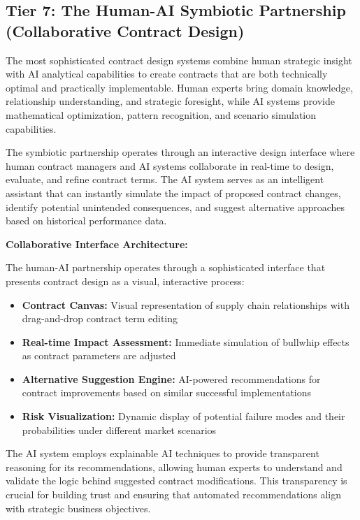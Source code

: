 \documentclass{article}
\begin{document}
\subsection{Tier 7: The Human-AI Symbiotic Partnership (Collaborative Contract Design)}

The most sophisticated contract design systems combine human strategic insight with AI analytical capabilities to create contracts that are both technically optimal and practically implementable. Human experts bring domain knowledge, relationship understanding, and strategic foresight, while AI systems provide mathematical optimization, pattern recognition, and scenario simulation capabilities.

The symbiotic partnership operates through an interactive design interface where human contract managers and AI systems collaborate in real-time to design, evaluate, and refine contract terms. The AI system serves as an intelligent assistant that can instantly simulate the impact of proposed contract changes, identify potential unintended consequences, and suggest alternative approaches based on historical performance data.

\textbf{Collaborative Interface Architecture:}

The human-AI partnership operates through a sophisticated interface that presents contract design as a visual, interactive process:

\begin{itemize}
\item \textbf{Contract Canvas:} Visual representation of supply chain relationships with drag-and-drop contract term editing
\item \textbf{Real-time Impact Assessment:} Immediate simulation of bullwhip effects as contract parameters are adjusted
\item \textbf{Alternative Suggestion Engine:} AI-powered recommendations for contract improvements based on similar successful implementations
\item \textbf{Risk Visualization:} Dynamic display of potential failure modes and their probabilities under different market scenarios
\end{itemize}

The AI system employs explainable AI techniques to provide transparent reasoning for its recommendations, allowing human experts to understand and validate the logic behind suggested contract modifications. This transparency is crucial for building trust and ensuring that automated recommendations align with strategic business objectives.
\end{document}
